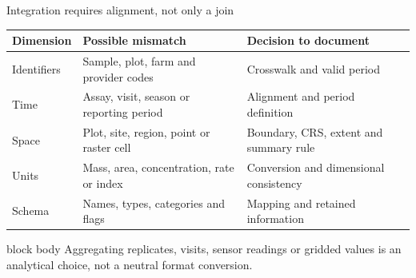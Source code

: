\documentclass[10pt,aspectratio=169]{beamer}
\begin{document}
\begin{frame}{Integration requires alignment, not only a join}

\scriptsize

\begin{tabularx}{\textwidth}{lXX}
\toprule
\textbf{Dimension} & \textbf{Possible mismatch} & \textbf{Decision to document} \\
\midrule
Identifiers & Sample, plot, farm and provider codes & Crosswalk and valid period \\
Time & Assay, visit, season or reporting period & Alignment and period definition \\
Space & Plot, site, region, point or raster cell & Boundary, CRS, extent and summary rule \\
Units & Mass, area, concentration, rate or index & Conversion and dimensional consistency \\
Schema & Names, types, categories and flags & Mapping and retained information \\
\bottomrule
\end{tabularx}

\vspace{0.45cm}

\small

\begin{beamercolorbox}[rounded=true,sep=8pt]{block body}
Aggregating replicates, visits, sensor readings or gridded values is an analytical choice, not a neutral format conversion.
\end{beamercolorbox}

\end{frame}
\end{document}

